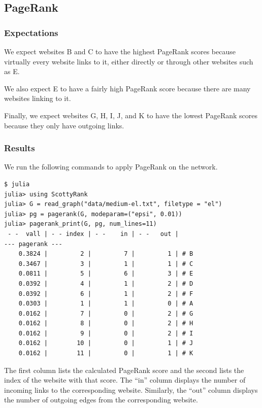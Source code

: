 \documentclass[12pt, titlepage, twoside]{amsart}
\begin{document}
\subsection{PageRank}

\subsubsection{Expectations}

We expect websites B and C to have the highest PageRank scores because virtually every website links to it,
either directly or through other websites such as E.

We also expect E to have a fairly high PageRank score because there are many websites linking to it.

Finally, we expect websites G, H, I, J, and K to have the lowest PageRank scores because they only have outgoing links.

\subsubsection{Results}

We run the following commands to apply PageRank on the network.

\begin{verbatim}
$ julia
julia> using ScottyRank
julia> G = read_graph("data/medium-el.txt", filetype = "el")
julia> pg = pagerank(G, modeparam=("epsi", 0.01))
julia> pagerank_print(G, pg, num_lines=11)
 - -  vall | - - index | - -    in | - -   out |
--- pagerank ---
    0.3824 |         2 |         7 |         1 | # B
    0.3467 |         3 |         1 |         1 | # C
    0.0811 |         5 |         6 |         3 | # E
    0.0392 |         4 |         1 |         2 | # D
    0.0392 |         6 |         1 |         2 | # F
    0.0303 |         1 |         1 |         0 | # A
    0.0162 |         7 |         0 |         2 | # G
    0.0162 |         8 |         0 |         2 | # H
    0.0162 |         9 |         0 |         2 | # I
    0.0162 |        10 |         0 |         1 | # J
    0.0162 |        11 |         0 |         1 | # K
\end{verbatim}

The first column lists the calculated PageRank score and
the second lists the index of the website with that score.
The ``in'' column displays the number of incoming links to the corresponding website.
Similarly, the ``out'' column displays the number of outgoing edges from the corresponding website.
\end{document}
